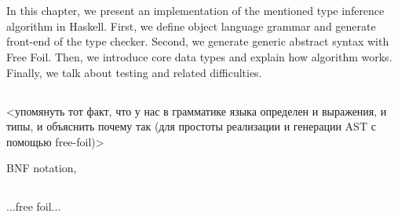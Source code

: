 \chapter{}
\label{chap:implementation}





In this chapter, we present an implementation of the mentioned type inference algorithm in Haskell. First, we define object language grammar and generate front-end of the type checker. Second, we generate generic abstract syntax with Free Foil. Then, we introduce core data types and explain how algorithm works. Finally, we talk about testing and related difficulties.

\section{}

<упомянуть тот факт, что у нас в грамматике языка определен и выражения, и типы, и объяснить почему так (для простоты реализации и генерации AST с помощью free-foil)>

BNF notation, 


\section{}

...free foil...


